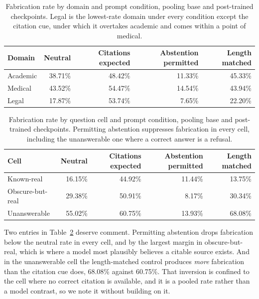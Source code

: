 \begin{table}[h]
\centering
\caption{Fabrication rate by domain and prompt condition, pooling base and
post-trained checkpoints. Legal is the lowest-rate domain under every condition
except the citation cue, under which it overtakes academic and comes within a
point of medical.}
\label{tab:bydomain}
\small
\begin{tabular}{lrrrr}
\toprule
Domain & Neutral & Citations expected & Abstention permitted & Length matched \\
\midrule
Academic & 38.71\% & 48.42\% & 11.33\% & 45.33\% \\
Medical  & 43.52\% & 54.47\% & 14.54\% & 43.94\% \\
Legal    & 17.87\% & 53.74\% &  7.65\% & 22.20\% \\
\bottomrule
\end{tabular}
\end{table}

\begin{table}[h]
\centering
\caption{Fabrication rate by question cell and prompt condition, pooling base
and post-trained checkpoints. Permitting abstention suppresses fabrication in
every cell, including the unanswerable one where a correct answer is a refusal.}
\label{tab:bycell}
\small
\begin{tabular}{lrrrr}
\toprule
Cell & Neutral & Citations expected & Abstention permitted & Length matched \\
\midrule
Known-real       & 16.15\% & 44.92\% & 11.44\% & 13.75\% \\
Obscure-but-real & 29.38\% & 50.91\% &  8.17\% & 30.34\% \\
Unanswerable     & 55.02\% & 60.75\% & 13.93\% & 68.08\% \\
\bottomrule
\end{tabular}
\end{table}

Two entries in Table~\ref{tab:bycell} deserve comment. Permitting abstention
drops fabrication below the neutral rate in every cell, and by the largest
margin in obscure-but-real, which is where a model most plausibly believes a
citable source exists. And in the unanswerable cell the length-matched control
produces \emph{more} fabrication than the citation cue does, 68.08\% against
60.75\%. That inversion is confined to the cell where no correct citation is
available, and it is a pooled rate rather than a model contrast, so we note it
without building on it.

